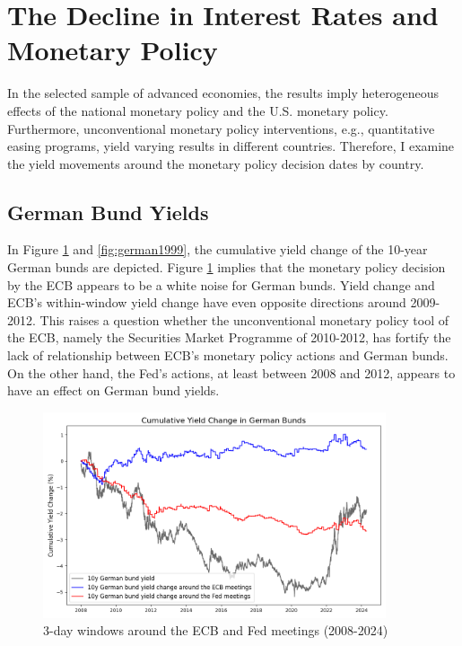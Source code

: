 \section{The Decline in Interest Rates and Monetary Policy}

In the selected sample of advanced economies, the results imply heterogeneous effects of the national monetary policy and the U.S. monetary policy. Furthermore, unconventional monetary policy interventions, e.g., quantitative easing programs, yield varying results in different countries. Therefore, I examine the yield movements around the monetary policy decision dates by country.

\subsection{German Bund Yields}

In Figure \ref{fig:german2008} and \ref{fig:german1999}, the cumulative yield change of the 10-year German bunds are depicted. Figure \ref{fig:german2008} implies that the monetary policy decision by the ECB appears to be a white noise for German bunds. Yield change and ECB's within-window yield change have even opposite directions around 2009-2012. This raises a question whether the unconventional monetary policy tool of the ECB, namely the Securities Market Programme of 2010-2012, has fortify the lack of relationship between ECB's monetary policy actions and German bunds. On the other hand, the Fed's actions, at least between 2008 and 2012, appears to have an effect on German bund yields.

\begin{figure}[!htbp]
    \centering
    \includegraphics[width=0.9\textwidth]{figures/2008_german_bunds_figure1a.png}
    \caption{3-day windows around the ECB and Fed meetings (2008-2024)}
    \label{fig:german2008}
\end{figure}


